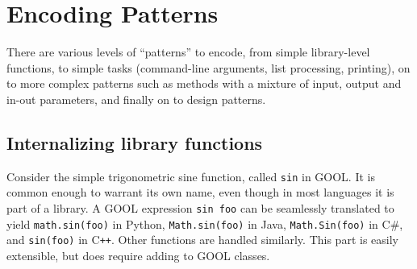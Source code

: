 \documentclass[sigplan,review,prologue,dvipsnames]{acmart}
\newcommand{\Csharp}{C\#}
\newcommand{\Cplusplus}{C\texttt{++}}
\begin{document}

\section{Encoding Patterns} \label{sec:patterns}

There are various levels of ``patterns'' to encode, from simple library-level 
functions, to simple tasks (command-line arguments, list processing, printing), 
on to more complex patterns such as methods with a mixture of input, output
and in-out parameters, and finally on to design patterns.

\subsection{Internalizing library functions}

Consider the simple trigonometric sine function, called \verb|sin| in
GOOL. It is common enough to warrant its own name, even though in most
languages it is part of a library.  A GOOL expression \verb|sin foo|
can be seamlessly translated to 
yield \verb|math.sin(foo)| in Python, \verb|Math.sin(foo)| in Java,
\verb|Math.Sin(foo)| in \Csharp, and \verb|sin(foo)| in \Cplusplus. Other
functions are handled similarly.  This part is easily extensible, but does
require adding to GOOL classes.
\end{document}
